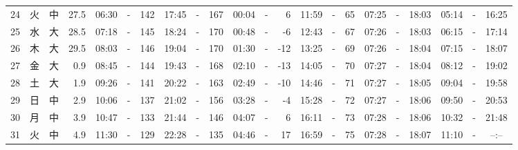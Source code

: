 \documentclass[12pt,a4j]{jsarticle}
\begin{document}
\begin{table}[htbp]
\begin{center}
{\begin{tabular}{|rc|cr|ccrccr|ccrccr|ccc|ccc|}
24 & 火 & 中 & 27.5 &  06:30 &-& 142 &  17:45 &-& 167 &  00:04 &-&   6 &  11:59 &-&  65 & 07:25 & -& 18:03 & 05:14 & -& 16:25 \\
25 & 水 & 大 & 28.5 &  07:18 &-& 145 &  18:24 &-& 170 &  00:48 &-&  -6 &  12:43 &-&  67 & 07:26 & -& 18:03 & 06:15 & -& 17:14 \\
26 & 木 & 大 & 29.5 &  08:03 &-& 146 &  19:04 &-& 170 &  01:30 &-& -12 &  13:25 &-&  69 & 07:26 & -& 18:04 & 07:15 & -& 18:07 \\
27 & 金 & 大 &  0.9 &  08:45 &-& 144 &  19:43 &-& 168 &  02:10 &-& -13 &  14:05 &-&  70 & 07:27 & -& 18:04 & 08:12 & -& 19:02 \\
28 & 土 & 大 &  1.9 &  09:26 &-& 141 &  20:22 &-& 163 &  02:49 &-& -10 &  14:46 &-&  71 & 07:27 & -& 18:05 & 09:04 & -& 19:58 \\
29 & 日 & 中 &  2.9 &  10:06 &-& 137 &  21:02 &-& 156 &  03:28 &-&  -4 &  15:28 &-&  72 & 07:27 & -& 18:06 & 09:50 & -& 20:53 \\
30 & 月 & 中 &  3.9 &  10:47 &-& 133 &  21:44 &-& 146 &  04:07 &-&   6 &  16:11 &-&  73 & 07:28 & -& 18:06 & 10:32 & -& 21:48 \\
31 & 火 & 中 &  4.9 &  11:30 &-& 129 &  22:28 &-& 135 &  04:46 &-&  17 &  16:59 &-&  75 & 07:28 & -& 18:07 & 11:10 & -& --:-- \\
   \hline
   \end{tabular}}
   \end{center}
\end{table}
\newpage
\end{document}
